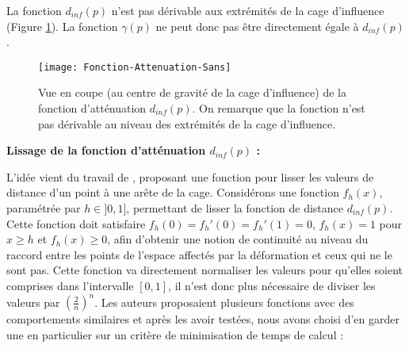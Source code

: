 \begin{center}
\end{center}

\newpage

La fonction $d_{inf}(p)$ n'est pas dérivable aux extrémités de la cage d'influence
(Figure \ref{MELAtN}). La fonction $\gamma(p)$ ne peut donc pas être
directement égale à $d_{inf}(p)$.

\begin{figure}[!ht]
\texttt{[image: Fonction-Attenuation-Sans]}

\caption[Fonction d'atténuation $d_{inf}(p)$] {Vue en coupe (au centre de
gravité de la cage d'influence) de la fonction d'atténuation $d_{inf}(p)$. On
remarque que la fonction n'est pas dérivable au niveau des extrémités de la
cage d'influence.}

\label{MELAtN}

\end{figure}

\textbf{Lissage de la fonction d'atténuation $d_{inf}(p)$ :}

L'idée vient du travail de \cite{GPCP13}, proposant une fonction pour lisser
les valeurs de distance d'un point à une arête de la cage. Considérons une
fonction $f_h(x)$, paramétrée par $h \in ]0, 1]$, permettant de lisser la
fonction de distance $d_{inf}(p)$. Cette fonction doit satisfaire $f_h(0) =
f_h'(0) = f_h'(1) = 0$, $f_h(x)=1$ pour $x \geq h$ et $f_h(x) \geq 0$, afin
d'obtenir une notion de continuité au niveau du raccord entre les points de
l'espace affectés par la déformation et ceux qui ne le sont pas. Cette
fonction va directement normaliser les valeurs pour qu'elles soient comprises
dans l'intervalle $[0,1]$, il n'est donc plus nécessaire de diviser les
valeurs par $(\frac{2}{n})^n$. Les auteurs proposaient plusieurs fonctions
avec des comportements similaires et après les avoir testées, nous avons
choisi d'en garder une en particulier sur un critère de minimisation de temps
de calcul :

